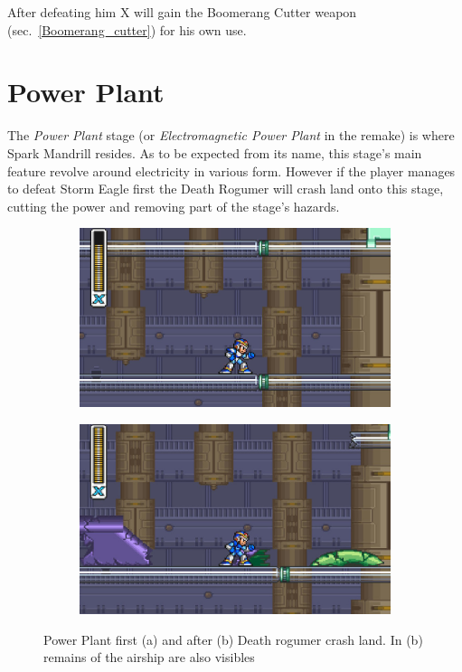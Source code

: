 After defeating him X will gain the Boomerang Cutter weapon (sec.~\ref{Boomerang_cutter}) for his own use.

\chapter{Power Plant}
The \textit{Power Plant} stage (or \textit{Electromagnetic Power Plant} in the remake) is where Spark Mandrill resides. As to be expected from its name, this stage's main feature revolve around electricity in various form. However if the player manages to defeat Storm Eagle first the Death Rogumer will crash land onto this stage, cutting the power and removing part of the stage's hazards.
\begin{figure}[htp]
	\centering
	\begin{subfigure}{0.42\linewidth}
		\centering
		\includegraphics[width=\linewidth]{figures/X1/Spark_mandrill/Mandrill_power.jpg}
		\caption{}
	\end{subfigure}
	\begin{subfigure}{0.4\linewidth}
		\centering
		\includegraphics[width=\linewidth]{figures/X1/Spark_mandrill/Mandrill_no_power.jpg}
		\caption{}
	\end{subfigure}
	\caption{Power Plant first (a) and after (b) Death rogumer crash land. In (b) remains of the airship are also visibles}
\end{figure}

